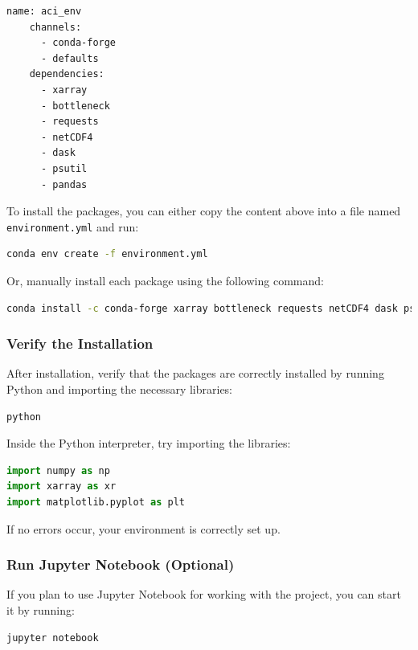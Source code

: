 \documentclass[a4paper,12pt]{article}
\begin{document}
\begin{lstlisting}[language=bash]
    name: aci_env
    channels:
      - conda-forge
      - defaults
    dependencies:
      - xarray
      - bottleneck
      - requests
      - netCDF4
      - dask
      - psutil
      - pandas
\end{lstlisting}

To install the packages, you can either copy the content above into a file named \texttt{environment.yml} and run:

\begin{lstlisting}[language=bash]
conda env create -f environment.yml
\end{lstlisting}

Or, manually install each package using the following command:

\begin{lstlisting}[language=bash]
    conda install -c conda-forge xarray bottleneck requests netCDF4 dask psutil pandas
\end{lstlisting}

\subsubsection{Verify the Installation}
After installation, verify that the packages are correctly installed by running Python and importing the necessary libraries:

\begin{lstlisting}[language=bash]
python
\end{lstlisting}

Inside the Python interpreter, try importing the libraries:

\begin{lstlisting}[language=python]
import numpy as np
import xarray as xr
import matplotlib.pyplot as plt
\end{lstlisting}

If no errors occur, your environment is correctly set up.

\subsubsection{Run Jupyter Notebook (Optional)}
If you plan to use Jupyter Notebook for working with the project, you can start it by running:

\begin{lstlisting}[language=bash]
jupyter notebook
\end{lstlisting}
\end{document}
